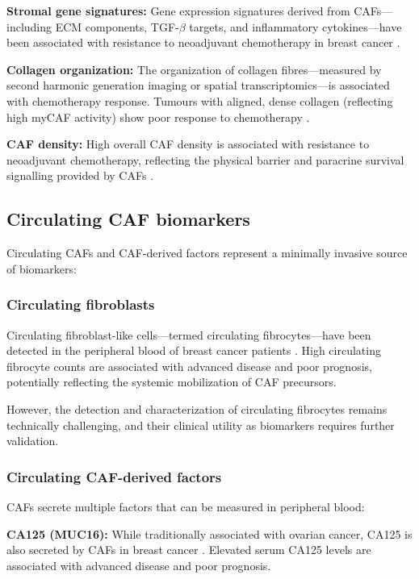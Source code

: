 \textbf{Stromal gene signatures:} Gene expression signatures derived from CAFs---including ECM components, TGF-$\beta$ targets, and inflammatory cytokines---have been associated with resistance to neoadjuvant chemotherapy in breast cancer \citep{farinha2019}.

\textbf{Collagen organization:} The organization of collagen fibres---measured by second harmonic generation imaging or spatial transcriptomics---is associated with chemotherapy response. Tumours with aligned, dense collagen (reflecting high myCAF activity) show poor response to chemotherapy \citep{provenzano2012}.

\textbf{CAF density:} High overall CAF density is associated with resistance to neoadjuvant chemotherapy, reflecting the physical barrier and paracrine survival signalling provided by CAFs \citep{farinha2019}.

\subsection{Circulating CAF biomarkers}

Circulating CAFs and CAF-derived factors represent a minimally invasive source of biomarkers:

\subsubsection{Circulating fibroblasts}

Circulating fibroblast-like cells---termed circulating fibrocytes---have been detected in the peripheral blood of breast cancer patients \citep{abe2012}. High circulating fibrocyte counts are associated with advanced disease and poor prognosis, potentially reflecting the systemic mobilization of CAF precursors.

However, the detection and characterization of circulating fibrocytes remains technically challenging, and their clinical utility as biomarkers requires further validation.

\subsubsection{Circulating CAF-derived factors}

CAFs secrete multiple factors that can be measured in peripheral blood:

\textbf{CA125 (MUC16):} While traditionally associated with ovarian cancer, CA125 is also secreted by CAFs in breast cancer \citep{seth2021}. Elevated serum CA125 levels are associated with advanced disease and poor prognosis.

